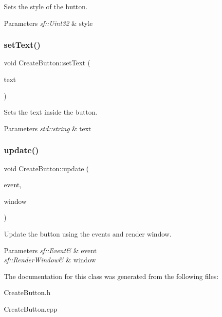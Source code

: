 Sets the style of the button. 


\begin{DoxyParams}{Parameters}
{\em sf\+::\+Uint32} & style \\
\hline
\end{DoxyParams}
\mbox{\label{class_create_button_a378916a4a556d2785da7ec655b8bdc96}} 
\subsubsection{\texorpdfstring{set\+Text()}{setText()}}
{\footnotesize\ttfamily void Create\+Button\+::set\+Text (\begin{DoxyParamCaption}\item[{std\+::string}]{text }\end{DoxyParamCaption})}



Sets the text inside the button. 


\begin{DoxyParams}{Parameters}
{\em std\+::string} & text \\
\hline
\end{DoxyParams}
\mbox{\label{class_create_button_aae831bb222ab9c712f07d7c9d0e16f20}} 
\subsubsection{\texorpdfstring{update()}{update()}}
{\footnotesize\ttfamily void Create\+Button\+::update (\begin{DoxyParamCaption}\item[{sf\+::\+Event \&}]{event,  }\item[{sf\+::\+Render\+Window \&}]{window }\end{DoxyParamCaption})}



Update the button using the events and render window. 


\begin{DoxyParams}{Parameters}
{\em sf\+::\+Event\&} & event \\
\hline
{\em sf\+::\+Render\+Window\&} & window \\
\hline
\end{DoxyParams}


The documentation for this class was generated from the following files\+:\begin{DoxyCompactItemize}
\item 
Create\+Button.\+h\item 
Create\+Button.\+cpp\end{DoxyCompactItemize}
